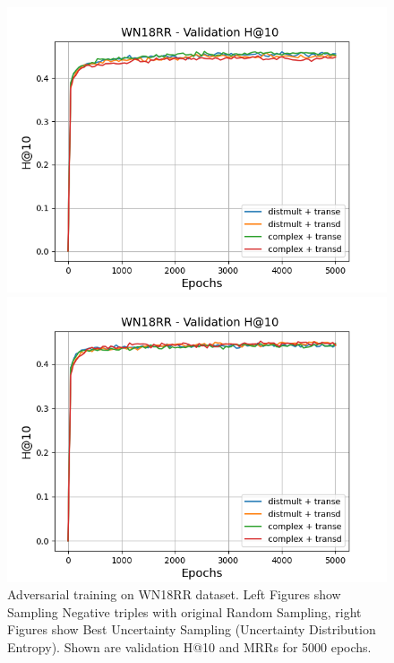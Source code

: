 \begin{figure}
\begin{minipage}{.5\textwidth}
    \end{minipage}
    \begin{minipage}{.5\textwidth}
      \centering
      \includegraphics[width=0.9\linewidth]{figures/results/gan_train/not_pretrained/random/wn18rr/gan_train_random_wn18rr_hit10s.png}
    \end{minipage}%
    \begin{minipage}{.5\textwidth}
      \centering
      \includegraphics[width=0.9\linewidth]{figures/results/gan_train/not_pretrained/uncertainty/max_distribution/entropy/wn18rr/gan_train_uncertainty_wn18rr_hit10s.png}
    \end{minipage}%
    \caption{Adversarial training on \textsc{WN18RR} dataset. 
    Left Figures show Sampling Negative triples with original Random Sampling, right Figures show Best Uncertainty Sampling (Uncertainty Distribution Entropy).
    Shown are validation H@10 and MRRs for 5000 epochs.}
    \label{fig:advtrain_wn18rr_random_vs_uncertainty}
\end{figure}